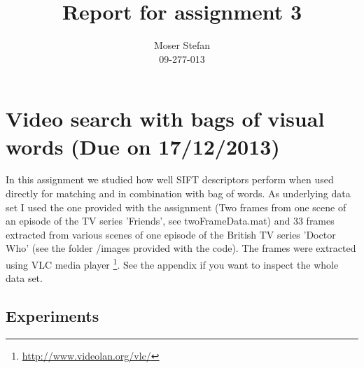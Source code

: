\documentclass{paper}
\title{Report for assignment 3}
\author{Moser Stefan\\09-277-013}
\begin{document}
\maketitle

\section{Video search with bags of visual words (Due on 17/12/2013)}
In this assignment we studied how well SIFT descriptors perform when used directly 
for matching and in combination with bag of words. As underlying data set I used the
one provided with the assignment (Two frames from one scene of an episode of the TV series 'Friends',
see twoFrameData.mat) and 33 frames extracted from various scenes of one episode of the
British TV series 'Doctor Who' (see the folder /images provided with the code). The
frames were extracted using VLC media player \footnote{\url{http://www.videolan.org/vlc/}}.
See the appendix if you want to inspect the whole data set.

\subsection{Experiments}
\end{document}
